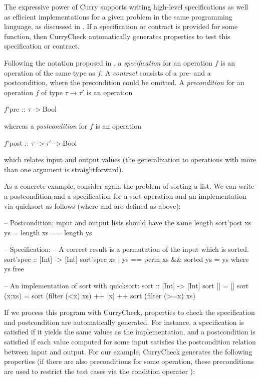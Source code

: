 The expressive power of Curry supports
writing high-level specifications
as well as efficient implementations for a given problem
in the same programming language,
as discussed in \cite{AntoyHanus12PADL}.
If a specification or contract is provided for some function,
then CurryCheck automatically generates properties
to test this specification or contract.

Following the notation proposed in \cite{AntoyHanus12PADL},
a \emph{specification}
for an operation $f$ is an operation 
of the same type as $f$.
A \emph{contract} consists
of a pre- and a postcondition, where the precondition could be omitted.
A \emph{precondition} for an operation $f$
of type $\tau \to \tau'$ is an operation
\begin{curry}
$f$'pre :: $\tau$ ->$~$Bool
\end{curry}
whereas
a \emph{postcondition} for $f$
is an operation
\begin{curry}
$f$'post :: $\tau$ ->$~\tau'$ ->$~$Bool
\end{curry}
which relates input and output values
(the generalization to operations with more than one argument
is straightforward).

As a concrete example, consider again the problem of sorting a list.
We can write a postcondition and a specification for
a sort operation  and an implementation via quicksort
as follows (where  and 
are defined as above):

\begin{curry}
-- Postcondition: input and output lists should have the same length
sort'post xs ys = length xs == length ys

-- Specification:
-- A correct result is a permutation of the input which is sorted.
sort'spec :: [Int] -> [Int]
sort'spec xs | ys == perm xs && sorted ys = ys  where ys free

-- An implementation of sort with quicksort:
sort :: [Int] -> [Int]
sort []     = []
sort (x:xs) = sort (filter (<x) xs) ++ [x] ++ sort (filter (>=x) xs)
\end{curry}
%
If we process this program with CurryCheck,
properties to check the specification and postcondition
are automatically generated. For instance,
a specification is satisfied if it yields the same values as
the implementation, and a postcondition is satisfied
if each value computed for some input satisfies the postcondition
relation between input and output. For our example, CurryCheck generates
the following properties (if there are also
preconditions for some operation, these preconditions are used
to restrict the test cases via the condition operater \ccode{==>}):

